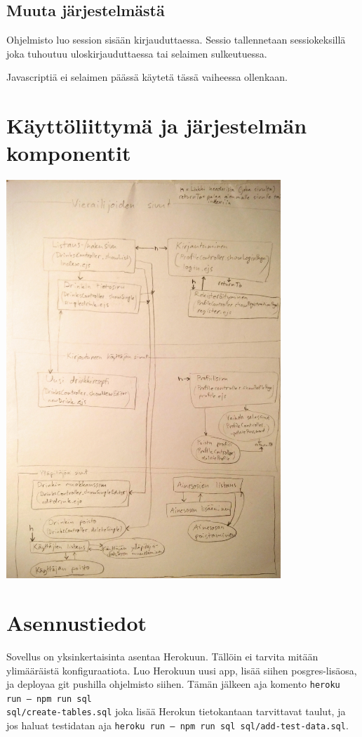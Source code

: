\documentclass[a4paper]{article}
\begin{document}
\subsection{Muuta järjestelmästä}
Ohjelmisto luo session sisään kirjauduttaessa. Sessio tallennetaan sessiokeksillä joka tuhoutuu uloskirjauduttaessa tai selaimen sulkeutuessa.

Javascriptiä ei selaimen päässä käytetä tässä vaiheessa ollenkaan.

\section{Käyttöliittymä ja järjestelmän komponentit}
\includegraphics[width=\textwidth, height=15cm, keepaspectratio]{komponenttikaavio}

\section{Asennustiedot}
Sovellus on yksinkertaisinta asentaa Herokuun. Tällöin ei tarvita mitään ylimääräistä konfiguraatiota. Luo Herokuun uusi app, lisää siihen posgres-lisäosa, ja deployaa git pushilla ohjelmisto siihen. Tämän jälkeen aja komento \texttt{heroku run -- npm run sql \\ sql/create-tables.sql} joka lisää Herokun tietokantaan tarvittavat taulut, ja jos haluat testidatan aja \texttt{heroku run -- npm run sql sql/add-test-data.sql}.
\end{document}
